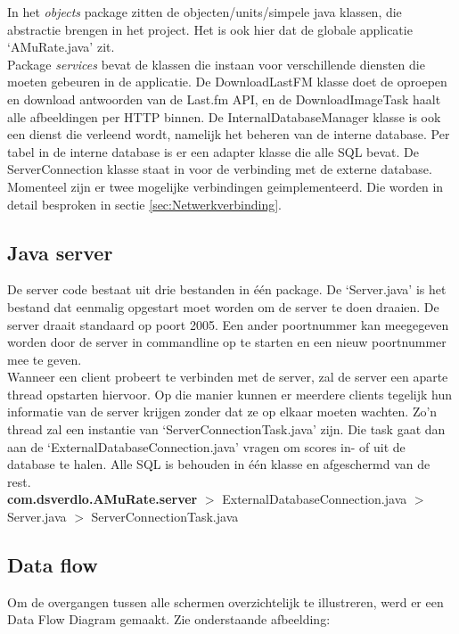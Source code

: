 \documentclass[11pt,a4paper]{article}
\newcommand{\pack}[1]{$>$ #1.java \newline}
\begin{document}
		In het \textit{objects} package zitten de objecten/units/simpele java klassen, die abstractie brengen in het project. Het is ook hier dat de globale applicatie `AMuRate.java' zit.  \\
		
		Package \textit{services} bevat de klassen die instaan voor verschillende diensten die moeten gebeuren in de applicatie. De DownloadLastFM klasse doet de oproepen en download antwoorden van de Last.fm API, en de DownloadImageTask haalt alle afbeeldingen per HTTP binnen. De InternalDatabaseManager klasse is ook een dienst die verleend wordt, namelijk het beheren van de interne database. Per tabel in de interne database is er een adapter klasse die alle SQL bevat. De ServerConnection klasse staat in voor de verbinding met de externe database. Momenteel zijn er twee mogelijke verbindingen geimplementeerd. Die worden in detail besproken in sectie \ref{sec:Netwerkverbinding}.

	\subsection{Java server}
	\label{sec:Java server}
	De server code bestaat uit drie bestanden in één package. De `Server.java' is het bestand dat eenmalig opgestart moet worden om de server te doen draaien. De server draait standaard op poort 2005. Een ander poortnummer kan meegegeven worden door de server in commandline op te starten en een nieuw poortnummer mee te geven. \\
	Wanneer een client probeert te verbinden met de server, zal de server een aparte thread opstarten hiervoor. Op die manier kunnen er meerdere clients tegelijk hun informatie van de server krijgen zonder dat ze op elkaar moeten wachten. Zo'n thread zal een instantie van `ServerConnectionTask.java' zijn. Die task gaat dan aan de `ExternalDatabaseConnection.java' vragen om scores in- of uit de database te halen. Alle SQL is behouden in één klasse en afgeschermd van de rest. \\
	
	\textbf{com.dsverdlo.AMuRate.server} \newline
	\pack{ExternalDatabaseConnection}
	\pack{Server}
	\pack{ServerConnectionTask}
	
	\subsection{Data flow}
	\label{sec:Data flow}
	Om de overgangen tussen alle schermen overzichtelijk te illustreren, werd er een Data Flow Diagram gemaakt. Zie onderstaande afbeelding: \newline
	
\end{document}
